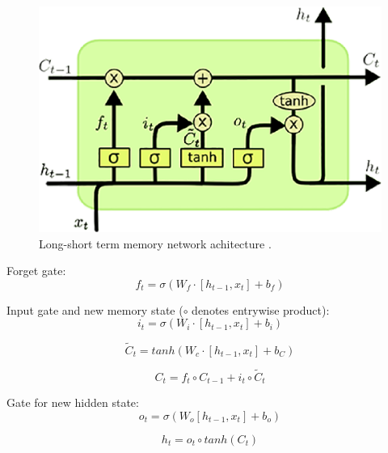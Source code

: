 \begin{figure}
\centering
\includegraphics{Figures/lstm}
\decoRule
\caption[Long-short term memory]{Long-short term memory network achitecture \parencite{lstm-picture}.}
\label{fig:word_embeddings}
\end{figure}

Forget gate:
\begin{equation}
f_t = \sigma(W_f\cdot[h_{t-1},x_t] + b_f)
\label{lstm:ft}
\end{equation} 

Input gate and new memory state ($\circ$ denotes entrywise product):
\begin{equation}
i_t=\sigma(W_i\cdot[h_{t-1}, x_t]+b_i)
\label{lstm:input}
\end{equation} 

\begin{equation}
\widetilde{C}_t = tanh(W_c\cdot[h_{t-1}, x_t]+b_C)
\label{lstm:c1}
\end{equation} 

\begin{equation}
C_t = f_t\circ C_{t-1}+i_t\circ\widetilde{C}_t
\label{lstm:c2}
\end{equation} 

Gate for new hidden state:
\begin{equation}
o_t=\sigma(W_o[h_{t-1},x_t]+b_o)
\label{lstm:o}
\end{equation} 

\begin{equation}
h_t=o_t\circ tanh(C_t)
\label{lstm:h}
\end{equation}

